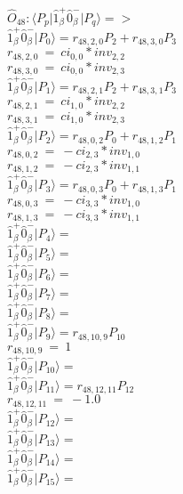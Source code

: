 \documentclass[14pt]{article}
\begin{document}
    $\hat{O}_{48}:  \langle{P_p}\vert \hat{1}_{\beta}^{+}\hat{0}_{\beta}^{-} \vert{P_q}\rangle => $ \\ 
    $ \hat{1}_{\beta}^{+}\hat{0}_{\beta}^{-} \vert{P_{0}}\rangle = {r}_{48,2,0}P_{2}+{r}_{48,3,0}P_{3} $ \\ 
    ${r}_{48,2,0}\ =\ {ci}_{0,0}*{inv}_{2,2} $ \\ 
    ${r}_{48,3,0}\ =\ {ci}_{0,0}*{inv}_{2,3} $ \\ 
    $ \hat{1}_{\beta}^{+}\hat{0}_{\beta}^{-} \vert{P_{1}}\rangle = {r}_{48,2,1}P_{2}+{r}_{48,3,1}P_{3} $ \\ 
    ${r}_{48,2,1}\ =\ {ci}_{1,0}*{inv}_{2,2} $ \\ 
    ${r}_{48,3,1}\ =\ {ci}_{1,0}*{inv}_{2,3} $ \\ 
    $ \hat{1}_{\beta}^{+}\hat{0}_{\beta}^{-} \vert{P_{2}}\rangle = {r}_{48,0,2}P_{0}+{r}_{48,1,2}P_{1} $ \\ 
    ${r}_{48,0,2}\ =\ -{ci}_{2,3}*{inv}_{1,0} $ \\ 
    ${r}_{48,1,2}\ =\ -{ci}_{2,3}*{inv}_{1,1} $ \\ 
    $ \hat{1}_{\beta}^{+}\hat{0}_{\beta}^{-} \vert{P_{3}}\rangle = {r}_{48,0,3}P_{0}+{r}_{48,1,3}P_{1} $ \\ 
    ${r}_{48,0,3}\ =\ -{ci}_{3,3}*{inv}_{1,0} $ \\ 
    ${r}_{48,1,3}\ =\ -{ci}_{3,3}*{inv}_{1,1} $ \\ 
    $ \hat{1}_{\beta}^{+}\hat{0}_{\beta}^{-} \vert{P_{4}}\rangle =  $ \\ 
    $ \hat{1}_{\beta}^{+}\hat{0}_{\beta}^{-} \vert{P_{5}}\rangle =  $ \\ 
    $ \hat{1}_{\beta}^{+}\hat{0}_{\beta}^{-} \vert{P_{6}}\rangle =  $ \\ 
    $ \hat{1}_{\beta}^{+}\hat{0}_{\beta}^{-} \vert{P_{7}}\rangle =  $ \\ 
    $ \hat{1}_{\beta}^{+}\hat{0}_{\beta}^{-} \vert{P_{8}}\rangle =  $ \\ 
    $ \hat{1}_{\beta}^{+}\hat{0}_{\beta}^{-} \vert{P_{9}}\rangle = {r}_{48,10,9}P_{10} $ \\ 
    ${r}_{48,10,9}\ =\ 1 $ \\ 
    $ \hat{1}_{\beta}^{+}\hat{0}_{\beta}^{-} \vert{P_{10}}\rangle =  $ \\ 
    $ \hat{1}_{\beta}^{+}\hat{0}_{\beta}^{-} \vert{P_{11}}\rangle = {r}_{48,12,11}P_{12} $ \\ 
    ${r}_{48,12,11}\ =\ -1.0 $ \\ 
    $ \hat{1}_{\beta}^{+}\hat{0}_{\beta}^{-} \vert{P_{12}}\rangle =  $ \\ 
    $ \hat{1}_{\beta}^{+}\hat{0}_{\beta}^{-} \vert{P_{13}}\rangle =  $ \\ 
    $ \hat{1}_{\beta}^{+}\hat{0}_{\beta}^{-} \vert{P_{14}}\rangle =  $ \\ 
    $ \hat{1}_{\beta}^{+}\hat{0}_{\beta}^{-} \vert{P_{15}}\rangle =  $ \\ 
    
\end{document}
